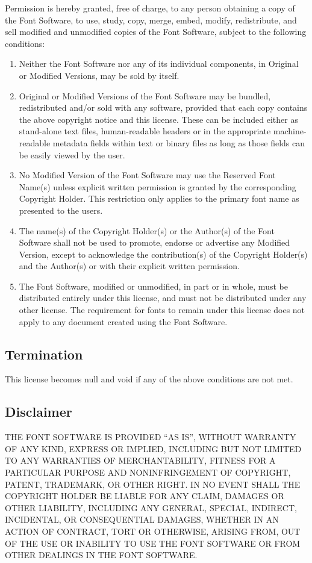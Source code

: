\documentclass[paper=a4, 12pt]{scrbook}
\begin{document}
Permission is hereby granted, free of charge, to any person obtaining a copy of the Font Software, to use, study, copy, merge, embed, modify, redistribute, and sell modified and unmodified copies of the Font Software, subject to the following conditions:

\begin{enumerate}
	\item Neither the Font Software nor any of its individual components, in Original or Modified Versions, may be sold by itself.
	\item Original or Modified Versions of the Font Software may be bundled, redistributed and/or sold with any software, provided that each copy contains the above copyright notice and this license. These can be included either as stand-alone text files, human-readable headers or in the appropriate machine-readable metadata fields within text or binary files as long as those fields can be easily viewed by the user.
	\item No Modified Version of the Font Software may use the Reserved Font Name(s) unless explicit written permission is granted by the corresponding Copyright Holder. This restriction only applies to the primary font name as presented to the users.

	\item The name(s) of the Copyright Holder(s) or the Author(s) of the Font Software shall not be used to promote, endorse or advertise any Modified Version, except to acknowledge the contribution(s) of the Copyright Holder(s) and the Author(s) or with their explicit written permission.

	\item The Font Software, modified or unmodified, in part or in whole, must be distributed entirely under this license, and must not be
distributed under any other license. The requirement for fonts to remain under this license does not apply to any document created using the Font Software.

\end{enumerate}

\subsection{Termination}

This license becomes null and void if any of the above conditions are not met.

\subsection{Disclaimer}

 THE FONT SOFTWARE IS PROVIDED “AS IS”, WITHOUT WARRANTY OF ANY KIND, EXPRESS OR IMPLIED, INCLUDING BUT NOT LIMITED TO ANY WARRANTIES OF MERCHANTABILITY, FITNESS FOR A PARTICULAR PURPOSE AND NONINFRINGEMENT OF COPYRIGHT, PATENT, TRADEMARK, OR OTHER RIGHT. IN NO EVENT SHALL THE COPYRIGHT HOLDER BE LIABLE FOR ANY CLAIM, DAMAGES OR OTHER LIABILITY, INCLUDING ANY GENERAL, SPECIAL, INDIRECT, INCIDENTAL, OR CONSEQUENTIAL DAMAGES, WHETHER IN AN ACTION OF CONTRACT, TORT OR OTHERWISE, ARISING FROM, OUT OF THE USE OR INABILITY TO USE THE FONT SOFTWARE OR FROM OTHER DEALINGS IN THE FONT SOFTWARE.
\end{document}
